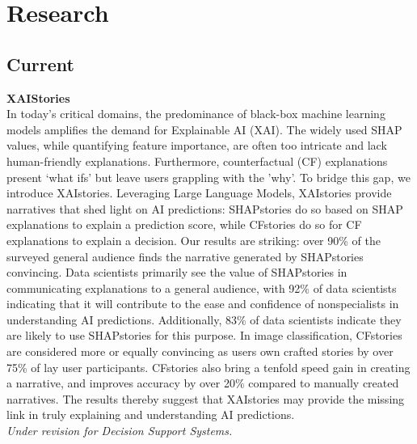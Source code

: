 \section{Research}

\subsection{Current}

\textbf{XAIStories}\\
In today's critical domains, the predominance of black-box machine learning models amplifies the demand for Explainable AI (XAI). The widely used SHAP values, while quantifying feature importance, are often too intricate and lack human-friendly explanations. Furthermore, counterfactual (CF) explanations present `what ifs' but leave users grappling with the 'why'. To bridge this gap, we introduce XAIstories. Leveraging Large Language Models, XAIstories provide narratives that shed light on AI predictions: SHAPstories do so based on SHAP explanations to explain a prediction score, while CFstories do so for CF explanations to explain a decision. Our results are striking: over 90\% of the surveyed general audience finds the narrative generated by SHAPstories convincing. Data scientists primarily see the value of SHAPstories in communicating explanations to a general audience, with 92\% of data scientists indicating that it will contribute to the ease and confidence of nonspecialists in understanding AI predictions. Additionally, 83\% of data scientists indicate they are likely to use SHAPstories for this purpose. In image classification, CFstories are considered more or equally convincing as users own crafted stories by over 75\% of lay user participants. CFstories also bring a tenfold speed gain in creating a narrative, and improves accuracy by over 20\% compared to manually created narratives. The results thereby suggest that XAIstories may provide the missing link in truly explaining and understanding AI predictions.\\
\textit{Under revision for Decision Support Systems.}


